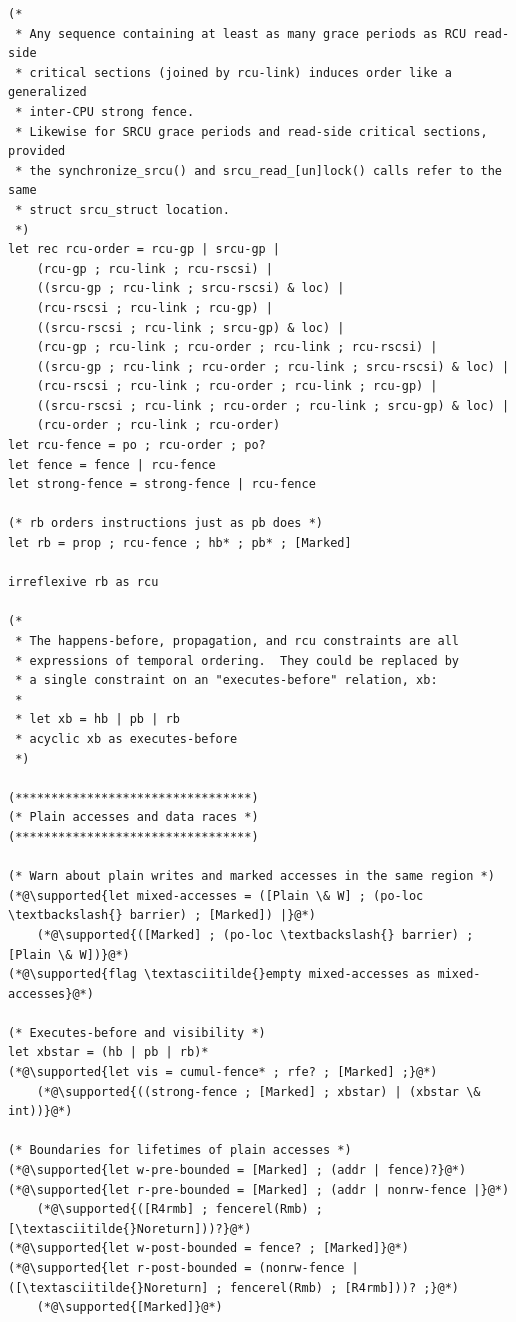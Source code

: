 \begin{lstlisting}
(*
 * Any sequence containing at least as many grace periods as RCU read-side
 * critical sections (joined by rcu-link) induces order like a generalized
 * inter-CPU strong fence.
 * Likewise for SRCU grace periods and read-side critical sections, provided
 * the synchronize_srcu() and srcu_read_[un]lock() calls refer to the same
 * struct srcu_struct location.
 *)
let rec rcu-order = rcu-gp | srcu-gp |
	(rcu-gp ; rcu-link ; rcu-rscsi) |
	((srcu-gp ; rcu-link ; srcu-rscsi) & loc) |
	(rcu-rscsi ; rcu-link ; rcu-gp) |
	((srcu-rscsi ; rcu-link ; srcu-gp) & loc) |
	(rcu-gp ; rcu-link ; rcu-order ; rcu-link ; rcu-rscsi) |
	((srcu-gp ; rcu-link ; rcu-order ; rcu-link ; srcu-rscsi) & loc) |
	(rcu-rscsi ; rcu-link ; rcu-order ; rcu-link ; rcu-gp) |
	((srcu-rscsi ; rcu-link ; rcu-order ; rcu-link ; srcu-gp) & loc) |
	(rcu-order ; rcu-link ; rcu-order)
let rcu-fence = po ; rcu-order ; po?
let fence = fence | rcu-fence
let strong-fence = strong-fence | rcu-fence

(* rb orders instructions just as pb does *)
let rb = prop ; rcu-fence ; hb* ; pb* ; [Marked]

irreflexive rb as rcu

(*
 * The happens-before, propagation, and rcu constraints are all
 * expressions of temporal ordering.  They could be replaced by
 * a single constraint on an "executes-before" relation, xb:
 *
 * let xb = hb | pb | rb
 * acyclic xb as executes-before
 *)

(*********************************)
(* Plain accesses and data races *)
(*********************************)

(* Warn about plain writes and marked accesses in the same region *)
(*@\supported{let mixed-accesses = ([Plain \& W] ; (po-loc \textbackslash{} barrier) ; [Marked]) |}@*)
	(*@\supported{([Marked] ; (po-loc \textbackslash{} barrier) ; [Plain \& W])}@*)
(*@\supported{flag \textasciitilde{}empty mixed-accesses as mixed-accesses}@*)

(* Executes-before and visibility *)
let xbstar = (hb | pb | rb)*
(*@\supported{let vis = cumul-fence* ; rfe? ; [Marked] ;}@*)
	(*@\supported{((strong-fence ; [Marked] ; xbstar) | (xbstar \& int))}@*)

(* Boundaries for lifetimes of plain accesses *)
(*@\supported{let w-pre-bounded = [Marked] ; (addr | fence)?}@*)
(*@\supported{let r-pre-bounded = [Marked] ; (addr | nonrw-fence |}@*)
	(*@\supported{([R4rmb] ; fencerel(Rmb) ; [\textasciitilde{}Noreturn]))?}@*)
(*@\supported{let w-post-bounded = fence? ; [Marked]}@*)
(*@\supported{let r-post-bounded = (nonrw-fence | ([\textasciitilde{}Noreturn] ; fencerel(Rmb) ; [R4rmb]))? ;}@*)
	(*@\supported{[Marked]}@*)


\end{lstlisting}
